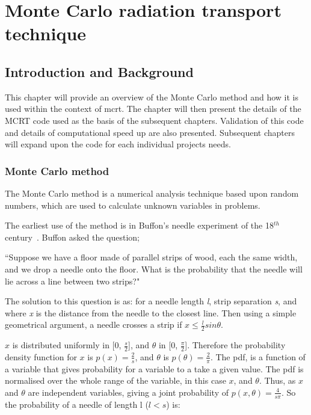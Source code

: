 \chapter{Monte Carlo radiation transport technique}

\section{Introduction and Background}
This chapter will provide an overview of the Monte Carlo method and how it is used within the context of \gls{mcrt}. The chapter will then present the details of the MCRT code used as the basis of the subsequent chapters. Validation of this code and details of computational speed up are also presented. Subsequent chapters will expand upon the code for each individual projects needs.

\subsection{Monte Carlo method}
The Monte Carlo method is a numerical analysis technique based upon random numbers, which are used to calculate unknown variables in problems. 

The earliest use of the method is in Buffon's needle experiment of the 18$^{th}$ century~\cite{badger1994lazzarini,beckmann2015history,buffon1785histoire}. Buffon asked the question;

\medskip

``Suppose we have a floor made of parallel strips of wood, each the same width, and we drop a needle onto the floor. What is the probability that the needle will lie across a line between two strips?"

\medskip

The solution to this question is as:
for a needle length \textit{l}, strip separation \textit{s}, and where \textit{x} is the distance from the needle to the closest line. Then using a simple geometrical argument, a needle crosses a strip if $x \leq \tfrac{l}{2} sin \theta$.

$x$ is distributed uniformly in [0, $\tfrac{s}{2}$], and $\theta$ in [0, $\tfrac{\pi}{2}$]. Therefore the probability density function for $x$ is $p(x)=\tfrac{2}{s}$, and $\theta$ is $p(\theta) = \tfrac{2}{\pi}$. The \gls{pdf}, is a function of a variable that gives probability for a variable to a take a given value. The \gls{pdf} is normalised over the whole range of the variable, in this case $x$, and $\theta$.
Thus, as $x$ and $\theta$ are independent variables, giving a joint probability of $p(x,\theta) = \tfrac{4}{s \pi}$.
So the probability of a needle of length l ($l<s$) is:

